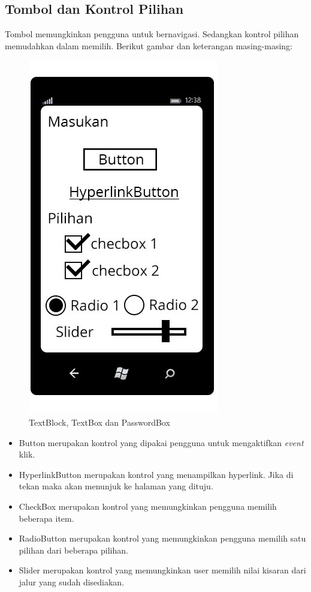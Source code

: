\subsection{Tombol dan Kontrol Pilihan}
\label{subsec:Tombol dan Kontrol Pilihan}
\hspace{0.5cm} Tombol memungkinkan pengguna untuk bernavigasi. Sedangkan kontrol pilihan memudahkan dalam memilih. Berikut gambar dan keterangan masing-masing:
 
\begin{figure}[h]
	\centering
		\includegraphics[scale=0.5]{Gambar/Tombol/tombol_dan_pilihan}
	\caption{TextBlock, TextBox dan PasswordBox}
	\label{fig:kontrol_tombol}
\end{figure}

\begin{itemize}
	\item Button merupakan kontrol yang dipakai pengguna untuk mengaktifkan \textit{event} klik.
	\item HyperlinkButton merupakan kontrol yang menampilkan hyperlink. Jika di tekan maka akan menunjuk ke halaman yang dituju.	
	\item CheckBox merupakan kontrol yang memungkinkan pengguna memilih beberapa item.
	\item RadioButton merupakan kontrol yang memungkinkan pengguna memilih satu pilihan dari beberapa pilihan.
	\item Slider merupakan kontrol yang memungkinkan user memilih nilai kisaran dari jalur yang sudah disediakan.
\end{itemize}

